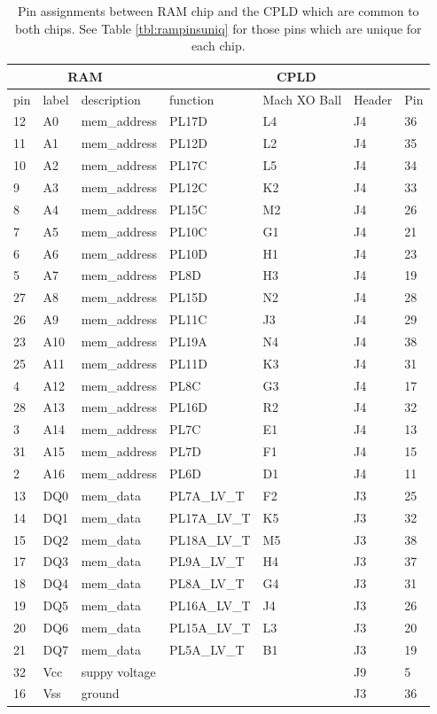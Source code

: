 \documentclass{article}
\begin{document}
\begin{table}
\center
\begin{tabular}{|l|l|l|l|l|l|l|}
	\hline
	\multicolumn{3}{|c|}{\textbf{RAM}} & \multicolumn{4}{|c|}{\textbf{CPLD}} \\
	\hline
	pin & label & description &  function & Mach XO Ball & Header & Pin \\
	\hline
	12 & A0 & mem\_address & PL17D & L4 & J4 & 36 \\
	\hline
	11 & A1 & mem\_address & PL12D & L2 & J4 & 35 \\
	\hline
	10 & A2 & mem\_address & PL17C & L5 & J4 & 34 \\
	\hline
	9 & A3 & mem\_address & PL12C & K2 & J4 & 33 \\
	\hline
	8 & A4 & mem\_address & PL15C & M2 & J4 & 26 \\
	\hline
	7 & A5 & mem\_address & PL10C & G1 & J4 & 21 \\
	\hline
	6 & A6 & mem\_address & PL10D & H1 & J4 & 23 \\
	\hline
	5 & A7 & mem\_address & PL8D & H3 & J4 & 19 \\
	\hline
	27 & A8 & mem\_address & PL15D & N2 & J4 & 28 \\
	\hline
	26 & A9 & mem\_address & PL11C & J3 & J4 & 29 \\
	\hline
	23 & A10 & mem\_address & PL19A & N4 & J4 & 38 \\
	\hline
	25 & A11 & mem\_address & PL11D & K3 & J4 & 31 \\
	\hline
	4 & A12 & mem\_address & PL8C & G3 & J4 & 17 \\
	\hline
	28 & A13 & mem\_address & PL16D & R2 & J4 & 32 \\
	\hline
	3 & A14 & mem\_address & PL7C & E1 & J4 & 13 \\
	\hline
	31 & A15 & mem\_address & PL7D & F1 & J4 & 15 \\
	\hline
	2 & A16 & mem\_address & PL6D & D1 & J4 & 11 \\
	\hline
	13 & DQ0 & mem\_data & PL7A\_LV\_T & F2 & J3 & 25 \\
	\hline
	14 & DQ1 & mem\_data & PL17A\_LV\_T & K5 & J3 & 32 \\
	\hline
	15 & DQ2 & mem\_data & PL18A\_LV\_T & M5 & J3 & 38 \\
	\hline
	17 & DQ3 & mem\_data & PL9A\_LV\_T & H4 & J3 & 37 \\
	\hline
	18 & DQ4 & mem\_data & PL8A\_LV\_T & G4 & J3 & 31 \\
	\hline
	19 & DQ5 & mem\_data & PL16A\_LV\_T & J4 & J3 & 26 \\
	\hline
	20 & DQ6 & mem\_data & PL15A\_LV\_T & L3 & J3 & 20 \\
	\hline
	21 & DQ7 & mem\_data & PL5A\_LV\_T & B1 & J3 & 19 \\
	\hline
	32 & Vcc & suppy voltage & & & J9 & 5 \\
	\hline
	16 & Vss & ground & & & J3 & 36 \\
	\hline
\end{tabular}
\caption{Pin assignments between RAM chip and the CPLD
which are common to both chips.
See Table \ref{tbl:rampinsuniq} for those pins which are
unique for each chip.
}
\end{table}
\end{document}
